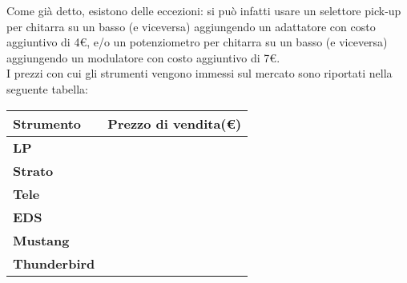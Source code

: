 \begin{table}[htbp]
\end{table}

Come già detto, esistono delle eccezioni: si può infatti usare un selettore pick-up per chitarra su un basso (e viceversa) aggiungendo un adattatore con costo aggiuntivo di 4\euro , e/o un potenziometro per chitarra su un basso (e viceversa) aggiungendo un modulatore con costo aggiuntivo di 7\euro . \\
\newpage
I prezzi con cui gli strumenti vengono immessi sul mercato sono riportati nella seguente tabella:

\begin{table}[htbp]
\begin{center}
\begin{tabular}{|l|l|}
\hline
\textbf{Strumento} & \textbf{Prezzo di vendita(\euro )} \\ \hline
\textbf{LP}                 &                            \\ \hline
\textbf{Strato}             &                            \\ \hline
\textbf{Tele}               &                            \\ \hline
\textbf{EDS}                &                            \\ \hline
\textbf{Mustang}            &                            \\ \hline
\textbf{Thunderbird}        &                            \\ \hline
\end{tabular}
\end{center}
\end{table}

